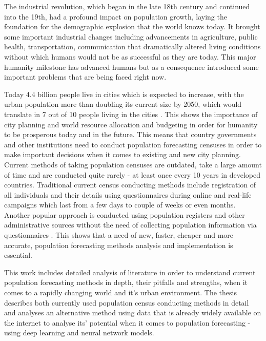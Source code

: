 
The industrial revolution, which began in the late 18th century and continued into the 19th, had a profound impact on population growth, laying the foundation for the demographic explosion that the world knows today. It brought some important industrial changes including advancements in agriculture, public health, transportation, communication that dramatically altered living conditions without which humans would not be as successful as they are today. This major humanity milestone has advanced humans but as a consequence introduced some important problems that are being faced right now.

Today 4.4 billion people live in cities which is expected to increase, with the urban population more than doubling its current size by 2050, which would translate in 7 out of 10 people living in the cities \cite{WrldBnkUrbanDevelopment}. This shows the importance of city planning and world resource allocation and budgeting in order for humanity to be prosperous today and in the future. This means that country governments and other institutions need to conduct population forecasting censuses in order to make important decisions when it comes to existing and new city planning. Current methods of taking population censuses are outdated, take a large amount of time and are conducted quite rarely - at least once every 10 years in developed countries. Traditional current census conducting methods include registration of all individuals and their details using questionnaires during online and real-life campaigns which last from a few days to couple of weeks or even months. Another popular approach is conducted using population registers and other administrative sources without the need of collecting population information via questionnaires \cite{CensusApproachesAndMethods}. This shows that a need of new, faster, cheaper and more accurate, population forecasting methods analysis and implementation is essential.

This work includes detailed analysis of literature in order to understand current population forecasting methods in depth, their pitfalls and strengths, when it comes to a rapidly changing world and it's urban environment. The thesis describes both currently used population census conducting methods in detail and analyses an alternative method using data that is already widely available on the internet to analyse its' potential when it comes to population forecasting - using deep learning and neural network models.

